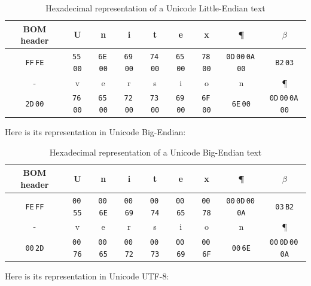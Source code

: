 \bigskip
\begin{table}[!h]
\begin{center}
\begin{tabular}{|c|c|c|c|c|c|c|c|c|}
\hline
BOM header & U & n & i & t & e & x & \P & $\beta$
\\
\hline
\verb+FF+\,\verb+FE+ & \verb+55+\,\verb+00+ & \verb+6E+\,\verb+00+ & \verb+69+\,\verb+00+ & \verb+74+\,\verb+00+ & \verb+65+\,\verb+00+ & \verb+78+\,\verb+00+
& \verb+0D+\,\verb+00+\,\verb+0A+\,\verb+00+ & \verb+B2+\,\verb+03+
\\
\hline
\hline
- & v & e & r & s & i & o & n & \P
\\
\hline
\verb+2D+\,\verb+00+ & \verb+76+\,\verb+00+ & \verb+65+\,\verb+00+ & \verb+72+\,\verb+00+ & \verb+73+\,\verb+00+ & \verb+69+\,\verb+00+ & \verb+6F+\,\verb+00+
& \verb+6E+\,\verb+00+ & \verb+0D+\,\verb+00+\,\verb+0A+\,\verb+00+
\\
\hline
\end{tabular}
\caption{Hexadecimal representation of a Unicode Little-Endian text}
\end{center}
\end{table}
\pagebreak
\bigskip
\noindent Here is its representation in Unicode Big-Endian:

\bigskip
\begin{table}[!h]
\begin{center}
\begin{tabular}{|c|c|c|c|c|c|c|c|c|}
\hline
BOM header & U & n & i & t & e & x & \P & $\beta$
\\
\hline
\verb+FE+\,\verb+FF+ & \verb+00+\,\verb+55+ & \verb+00+\,\verb+6E+ & \verb+00+\,\verb+69+ & \verb+00+\,\verb+74+ & \verb+00+\,\verb+65+ & \verb+00+\,\verb+78+
& \verb+00+\,\verb+0D+\,\verb+00+\,\verb+0A+ & \verb+03+\,\verb+B2+
\\
\hline
\hline
- & v & e & r & s & i & o & n & \P
\\
\hline
\verb+00+\,\verb+2D+ & \verb+00+\,\verb+76+ & \verb+00+\,\verb+65+ & \verb+00+\,\verb+72+ & \verb+00+\,\verb+73+ & \verb+00+\,\verb+69+ & \verb+00+\,\verb+6F+
& \verb+00+\,\verb+6E+ & \verb+00+\,\verb+0D+\,\verb+00+\,\verb+0A+
\\
\hline
\end{tabular}
\caption{Hexadecimal representation of a Unicode Big-Endian text}
\end{center}
\end{table}

\bigskip
\noindent Here is its representation in Unicode UTF-8:

